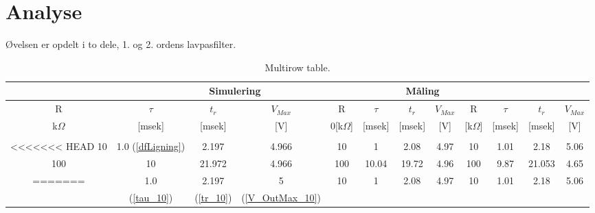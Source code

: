 \section{Analyse}
Øvelsen er opdelt i to dele, 1. og 2. ordens lavpasfilter.







\begin{center}
\begin{table}[]
\caption{Multirow table.}
    \label{tab:table1}
    
\begin{tabular}{|c|c|c|c|c|c|c|c|c|c|c|c|}
\hline

\rowcolor[gray]{.6}
 
 \multicolumn{4}{|c|}{\textbf{Analyse}}&\multicolumn{4}{c|}{\textbf{Simulering}}&\multicolumn{4}{c|}{\textbf{Måling}}\\ \hline
 
      \multicolumn{1}{|c|}{\multirow{1}{*}{R }} & \multicolumn{1}{c|}{\multirow{1}{*}{$\tau$ }}  & \multicolumn{1}{c|}{\multirow{1}{*}{$t_{r}$ }}   & \multicolumn{1}{c|}{\multirow{1}{*}{$V_{Max}$ }}  &  \multicolumn{1}{c|}{\multirow{1}{*}{R }} & \multicolumn{1}{c|}{\multirow{1}{*}{$\tau$ }}  & \multicolumn{1}{c|}{\multirow{1}{*}{$t_{r}$ }}   & \multicolumn{1}{c|}{\multirow{1}{*}{$V_{Max}$ }}  &  \multicolumn{1}{c|}{\multirow{1}{*}{R }} & \multicolumn{1}{c|}{\multirow{1}{*}{$\tau$ }}  & \multicolumn{1}{c|}{\multirow{1}{*}{$t_{r}$ }}   & \multicolumn{1}{c|}{\multirow{1}{*}{$V_{Max}$ }}  \\ 
      
k$\Omega$  & [msek]  &  [msek] & [V]  & 0[k$\Omega$]  & [msek]   &  [msek] & [V]  & [k$\Omega$]   &  [msek]  &  [msek]  & [V]\\ \hline
\rowcolor[gray]{.8}
    \multicolumn{12}{|c|}{\textbf{ 1. ordens lavpas filter}} \\ \hline 
 
<<<<<<< HEAD
   10  & 1.0 (\ref{dfLigning})   & 2.197   & 4.966 	  &  10 &  1   & 2.08  & 4.97   &  10  &  1.01   &  2.18   & 5.06 \\ \hline 

   100&  10   & 21.972  & 4.966  &  100 & 10.04  &  19.72   & 4.96  &  100 &  9.87  &  21.053  &  4.65  \\\hline 
=======
  \multicolumn{1}{|c|}{\multirow{2}{*}{10 }}    & 1.0    & 2.197   & 5 	  &  10 &  1   & 2.08  & 4.97   &  10  &  1.01   &  2.18   & 5.06 \\ 
   &(\ref{tau_10})& (\ref{tr_10})& (\ref{V_OutMax_10}) &&&&&&&& \\ \hline


\end{tabular}
\end{table}
\end{center}
